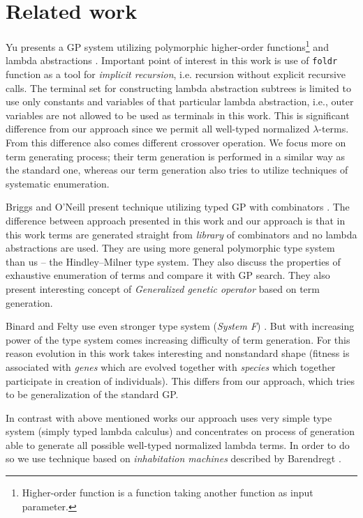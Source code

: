 \documentclass{sig-alternate}
\newcommand{\lterms}{$\lambda$-terms\xspace}
\begin{document}
\section{Related work}
\label{related}

Yu presents a GP system utilizing
polymorphic higher-order functions\footnote{Higher-order 
function is a function taking another function as 
input parameter.} and lambda abstractions  \cite{yu01}.
Important point of interest in this work is use of
\texttt{foldr} function as a tool for \textit{implicit recursion},
i.e. recursion without explicit recursive calls. 
The terminal set for constructing lambda abstraction subtrees 
is limited to use only constants and variables of that particular
lambda abstraction, i.e., outer variables are not allowed to be used
as terminals in this work. This is significant difference from our approach 
since we permit all well-typed normalized \lterms. From this difference also
comes different crossover operation. We focus more on term generating process; 
their term generation is performed in a similar way as the standard one, 
whereas our term generation also tries to utilize techniques of systematic enumeration. 

Briggs and O’Neill present technique 
utilizing typed GP with combinators \cite{kes}.
The difference between approach presented in this work
and our approach is that in this work terms are generated
straight from \textit{library} of combinators and no lambda abstractions
are used. They are using more general polymorphic type system than us
-- the Hindley–Milner type system. They also discuss the 
properties of exhaustive enumeration of terms and compare it with GP search.  
They also present interesting concept of \textit{Generalized
genetic operator} based on term generation. 

Binard and Felty use even 
stronger type system (\textit{System F}) \cite{binard2008genetic}.  
But with increasing power of the type system comes increasing difficulty of term generation.
For this reason evolution in this work takes interesting and nonstandard shape 
(fitness is associated with \textit{genes} which are evolved together with \textit{species}
which together participate in creation of individuals).
This differs from our approach, which tries to be generalization of
the standard GP\cite{koza92}.

In contrast with above mentioned works our approach uses very simple type system 
(simply typed lambda calculus) and concentrates on process of generation  
able to generate all possible well-typed normalized lambda terms. In order to do
so we use technique based on \textit{inhabitation machines} 
described by Barendregt \cite{barendregt10}.    
\end{document}
